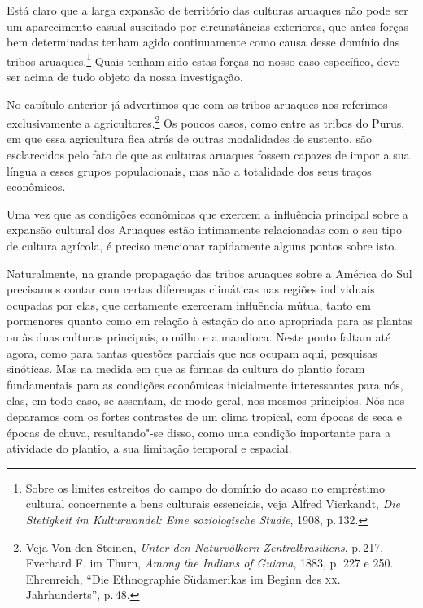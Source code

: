 Está claro que a larga expansão de território das culturas aruaques não
pode ser um aparecimento casual suscitado por circunstâncias exteriores,
que antes forças bem determinadas tenham agido continuamente como causa
desse domínio das tribos aruaques.\footnote{Sobre os limites estreitos do
  campo do domínio do acaso no empréstimo cultural concernente a bens
  culturais essenciais, veja Alfred Vierkandt, \textit{Die Stetigkeit im
  Kulturwandel: Eine soziologische Studie}, 1908, p.\,132.} Quais tenham sido
estas forças no nosso caso específico, deve ser acima de tudo objeto da
nossa investigação.

No capítulo anterior já advertimos que com as tribos aruaques nos
referimos exclusivamente a agricultores.\footnote{Veja Von den Steinen,
  \textit{Unter den Naturvölkern Zentralbrasiliens}, p.\,217.
  Everhard F. im Thurn, \textit{Among the Indians of Guiana}, 1883, p.
  227 e 250. Ehrenreich, ``Die Ethnographie Südamerikas im Beginn des \textsc{xx}.
  Jahrhunderts'', p.\,48.} Os poucos casos, como entre as tribos do
Purus, em que essa agricultura fica atrás de outras modalidades de
sustento, são esclarecidos pelo fato de que as culturas aruaques fossem
capazes de impor a sua língua a esses grupos populacionais, mas não a
totalidade dos seus traços econômicos.

Uma vez que as condições econômicas que exercem a influência principal
sobre a expansão cultural dos Aruaques estão intimamente relacionadas com
o seu tipo de cultura agrícola, é preciso mencionar rapidamente alguns pontos sobre isto.

Naturalmente, na grande propagação das tribos aruaques sobre a América do
Sul precisamos contar com certas diferenças climáticas nas regiões
individuais ocupadas por elas, que certamente exerceram influência
mútua, tanto em pormenores quanto como em relação à estação do ano
apropriada para as plantas ou às duas culturas principais, o
milho e a mandioca. Neste ponto faltam até agora, como para tantas
questões parciais que nos ocupam aqui, pesquisas sinóticas. Mas na
medida em que as formas da cultura do plantio foram fundamentais para as
condições econômicas inicialmente interessantes para nós, elas, em todo
caso, se assentam, de modo geral, nos mesmos princípios. Nós nos
deparamos com os fortes contrastes de um clima tropical, com épocas de
seca e épocas de chuva, resultando"-se disso, como uma condição
importante para a atividade do plantio, a sua limitação temporal e
espacial.


